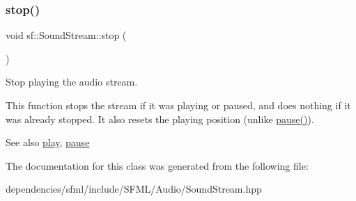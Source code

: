 \subsubsection{\texorpdfstring{stop()}{stop()}}
{\footnotesize\ttfamily void sf\+::\+Sound\+Stream\+::stop (\begin{DoxyParamCaption}{ }\end{DoxyParamCaption})}



Stop playing the audio stream. 

This function stops the stream if it was playing or paused, and does nothing if it was already stopped. It also resets the playing position (unlike \hyperlink{classsf_1_1_sound_stream_a932ff181e661503cad288b4bb6fe45ca}{pause()}).

\begin{DoxySeeAlso}{See also}
\hyperlink{classsf_1_1_sound_stream_afdc08b69cab5f243d9324940a85a1144}{play}, \hyperlink{classsf_1_1_sound_stream_a932ff181e661503cad288b4bb6fe45ca}{pause} 
\end{DoxySeeAlso}


The documentation for this class was generated from the following file\+:\begin{DoxyCompactItemize}
\item 
dependencies/sfml/include/\+S\+F\+M\+L/\+Audio/Sound\+Stream.\+hpp\end{DoxyCompactItemize}
